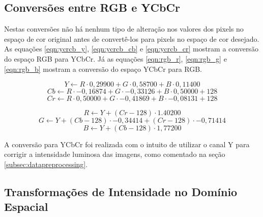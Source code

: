 \subsection{Conversões entre RGB e YCbCr}

Nestas conversões não há nenhum tipo de alteração nos valores dos pixels no espaço de cor original antes de convertê-los para pixels no espaço de cor desejado.
As equações \ref{eqn:ycrcb_y}, \ref{eqn:ycrcb_cb} e \ref{eqn:ycrcb_cr} mostram a conversão do espaço RGB para YCbCr.
Já as equações \ref{eqn:rgb_r}, \ref{eqn:rgb_g} e \ref{eqn:rgb_b} mostram a conversão do espaço YCbCr para RGB.

\begin{equation}
    \label{eqn:ycrcb_y}
    Y \xleftarrow{} R \cdot 0,29900 + G \cdot 0,58700 + B \cdot 0,11400
\end{equation}
\begin{equation}
    \label{eqn:ycrcb_cb}
    Cb \xleftarrow{} R \cdot -0,16874 + G \cdot -0,33126 + B \cdot 0,50000 + 128
\end{equation}
\begin{equation}
    \label{eqn:ycrcb_cr}
    Cr \xleftarrow{} R \cdot 0,50000 + G \cdot -0,41869 + B \cdot - 0,08131 + 128
\end{equation}

\begin{equation}
    \label{eqn:rgb_r}
    R \xleftarrow{} Y + (Cr - 128) \cdot 1.40200
\end{equation}
\begin{equation}
    \label{eqn:rgb_g}
    G \xleftarrow{} Y + (Cb - 128) \cdot -0,34414 + (Cr - 128) \cdot -0,71414
\end{equation}
\begin{equation}
    \label{eqn:rgb_b}
    B \xleftarrow{} Y + (Cb - 128) \cdot 1,77200
\end{equation}

A conversão para YCbCr foi realizada com o intuito de utilizar o canal Y para corrigir a intensidade luminosa das imagens, como comentado na seção \ref{subsec:datapreprocessing}.

\subsection{Transformações de Intensidade no Domínio Espacial}

